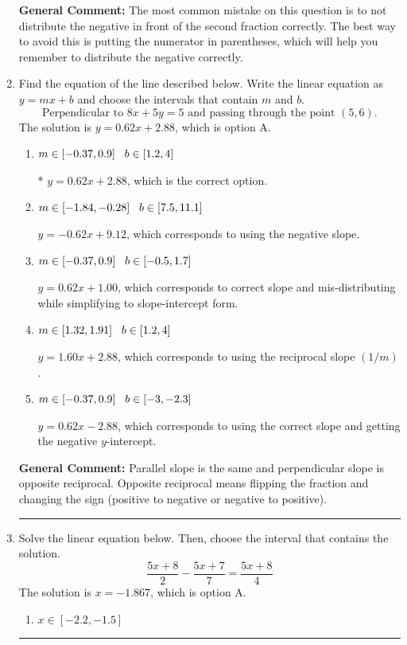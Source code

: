 \documentclass{extbook}[14pt]
\newcommand{\litem}[1]{\item #1

\rule{\textwidth}{0.4pt}}
\begin{document}
\begin{enumerate}
{\textbf{General Comment:} The most common mistake on this question is to not distribute the negative in front of the second fraction correctly. The best way to avoid this is putting the numerator in parentheses, which will help you remember to distribute the negative correctly.
}
\litem{
Find the equation of the line described below. Write the linear equation as $ y=mx+b $ and choose the intervals that contain $m$ and $b$.
\[ \text{Perpendicular to } 8 x + 5 y = 5 \text{ and passing through the point } (5, 6). \]The solution is \( y = 0.62x + 2.88 \), which is option A.\begin{enumerate}[label=\Alph*.]
\item \( m \in [-0.37, 0.9] \hspace*{3mm} b \in [1.2, 4] \)

* $y = 0.62x + 2.88$, which is the correct option.
\item \( m \in [-1.84, -0.28] \hspace*{3mm} b \in [7.5, 11.1] \)

 $y = -0.62x + 9.12$, which corresponds to using the negative slope.
\item \( m \in [-0.37, 0.9] \hspace*{3mm} b \in [-0.5, 1.7] \)

 $y = 0.62x + 1.00$, which corresponds to correct slope and mis-distributing while simplifying to slope-intercept form.
\item \( m \in [1.32, 1.91] \hspace*{3mm} b \in [1.2, 4] \)

 $y = 1.60x + 2.88$, which corresponds to using the reciprocal slope $(1/m)$.
\item \( m \in [-0.37, 0.9] \hspace*{3mm} b \in [-3, -2.3] \)

 $y = 0.62x - 2.88$, which corresponds to using the correct slope and getting the negative $y$-intercept.
\end{enumerate}

\textbf{General Comment:} Parallel slope is the same and perpendicular slope is opposite reciprocal. Opposite reciprocal means flipping the fraction and changing the sign (positive to negative or negative to positive).
}
\litem{
Solve the linear equation below. Then, choose the interval that contains the solution.
\[ \frac{5x + 8}{2} - \frac{5x + 7}{7} = \frac{5x + 8}{4} \]The solution is \( x = -1.867 \), which is option A.\begin{enumerate}[label=\Alph*.]
\item \( x \in [-2.2, -1.5] \)


\end{enumerate}}
\end{enumerate}
\end{document}

